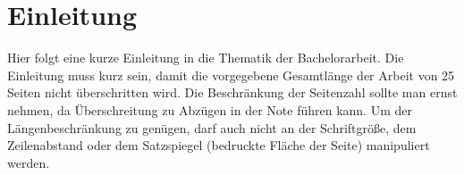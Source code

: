 \chapter{Einleitung}
Hier folgt eine kurze Einleitung in die Thematik der Bachelorarbeit.
Die Einleitung muss kurz sein, damit die vorgegebene Gesamtlänge der 
Arbeit von 25 Seiten nicht überschritten wird. 
Die Beschränkung der Seitenzahl sollte man ernst nehmen,
da Überschreitung zu Abzügen in der Note führen kann. 
Um der Längenbeschränkung zu genügen, darf auch nicht an der Schriftgröße,
dem Zeilenabstand oder dem Satzspiegel (bedruckte Fläche der Seite) manipuliert werden.
